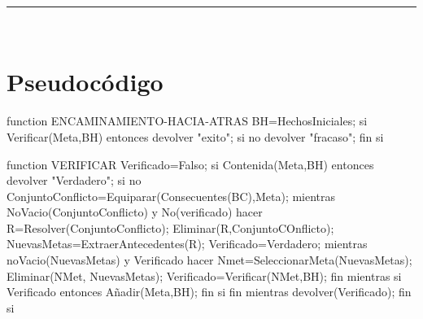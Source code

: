 
\begin{center}
	{\fboxrule=4pt } \\
	\setcounter{chapter}{2}
	\setcounter{section}{0}
	\rule{15cm}{0pt} \\
\end{center}

\section{Pseudocódigo}
\begin{listing}[language=Pascal]
function ENCAMINAMIENTO-HACIA-ATRAS
  BH=HechosIniciales;
  si Verificar(Meta,BH) entonces devolver "exito";
  si no
    devolver "fracaso";
  fin si
\end{listing}
\begin{listing}[language=Pascal]
function VERIFICAR
  Verificado=Falso;
  si Contenida(Meta,BH) entonces devolver "Verdadero";
  si no
    ConjuntoConflicto=Equiparar(Consecuentes(BC),Meta);
    mientras NoVacio(ConjuntoConflicto) y No(verificado) hacer
      R=Resolver(ConjuntoConflicto);
	  Eliminar(R,ConjuntoCOnflicto);
	  NuevasMetas=ExtraerAntecedentes(R);
	  Verificado=Verdadero;
	  mientras noVacio(NuevasMetas) y Verificado hacer
	  	Nmet=SeleccionarMeta(NuevasMetas);
		Eliminar(NMet, NuevasMetas);
		Verificado=Verificar(NMet,BH);
	  fin mientras
	  si Verificado entonces A\~nadir(Meta,BH);
	  fin si
	fin mientras
	devolver(Verificado);
  fin si



\end{listing}

\newpage




